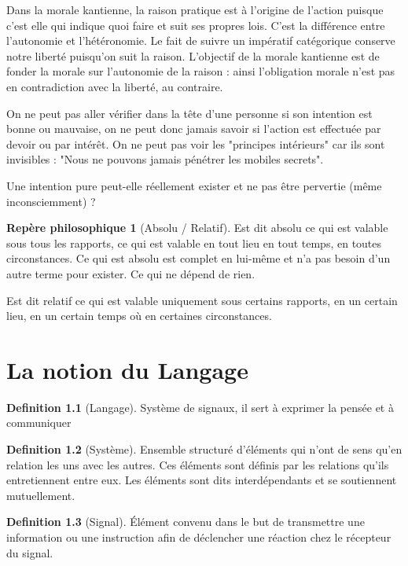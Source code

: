 \documentclass[french]{book}
\theoremstyle{definition}
\newtheorem*{dfn}{Definition}
\newtheorem*{rep}{Repère philosophique}
\begin{document}
Dans la morale kantienne, la raison pratique est à l'origine de l'action puisque c'est elle qui indique quoi faire et suit ses propres lois. C'est la différence entre l'autonomie et l'hétéronomie.
Le fait de suivre un impératif catégorique conserve notre liberté puisqu'on suit la raison.
L'objectif de la morale kantienne est de fonder la morale sur l'autonomie de la raison : ainsi l'obligation morale n'est pas en contradiction avec la liberté, au contraire.


On ne peut pas aller vérifier dans la tête d'une personne si son intention est bonne ou mauvaise, on ne peut donc jamais savoir si l'action est effectuée par devoir ou par intérêt. On ne peut pas voir les "principes intérieurs" car ils sont invisibles :
"Nous ne pouvons jamais pénétrer les mobiles secrets".

Une intention pure peut-elle réellement exister et ne pas être pervertie (même inconsciemment) ?


\begin{rep}[Absolu / Relatif]

Est dit absolu ce qui est valable sous tous les rapports, ce qui est valable en tout lieu en tout temps, en toutes circonstances. Ce qui est absolu est complet en lui-même et n'a pas besoin d'un autre terme pour exister. Ce qui ne dépend de rien.

Est dit relatif ce qui est valable uniquement sous certains rapports, en un certain lieu, en un certain temps où en certaines circonstances.
\end{rep}



\chapter{La notion du Langage}

\begin{dfn}[Langage]
Système de signaux, il sert à exprimer la pensée et à communiquer
\end{dfn}

\begin{dfn}[Système] 
Ensemble structuré d'éléments qui n'ont de sens qu'en relation les uns avec les autres. Ces éléments sont définis par les relations qu'ils entretiennent entre eux. Les éléments sont dits interdépendants et se soutiennent mutuellement.
\end{dfn}

\begin{dfn}[Signal]
Élément convenu dans le but de transmettre une information ou une instruction afin de déclencher une réaction chez le récepteur du signal.
\end{dfn}
\end{document}
